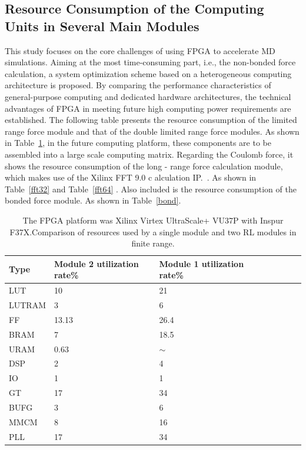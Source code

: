 \documentclass{article}
\begin{document}
\subsection{Resource Consumption of the Computing Units in Several Main Modules}

This study focuses on the core challenges of using FPGA to accelerate MD 
simulations. 
Aiming at the most time-consuming part, i.e., the non-bonded force calculation, 
a system optimization scheme based on a heterogeneous computing architecture is 
proposed. 
By comparing the performance characteristics of general-purpose computing and 
dedicated hardware architectures, the technical advantages of FPGA in meeting 
future high computing power requirements are established. 
The following table presents the resource consumption of the limited range 
force module and that of the double limited range force modules.
As shown in Table~\ref{RL}, in the future computing platform, these components 
are to be assembled into a large scale computing matrix.
Regarding the Coulomb force, it shows the resource consumption of the 
long - range force calculation module, which makes use of the Xilinx FFT 9.0 c
alculation IP.~\cite{fpga23}.
As shown in Table~\ref{fft32} and Table~\ref{fft64} .
Also included is the resource consumption of the bonded force module.
As shown in Table~\ref{bond}.

\begin{table}[!ht]
	\centering
		\caption {The FPGA platform was Xilinx Virtex UltraScale+ VU37P with Inspur F37X.Comparison of resources used by a single module and two RL modules in finite range.}
	\begin{tabular*}{\hsize}{@{}@{\extracolsep{\fill}}llllllll@{}}
		\toprule
		Type &Module 2 utilization rate\%&Module 1 utilization rate\%  \\ 
		\midrule
		LUT &10 & 21 \\ 
		LUTRAM & 3 & 6  \\ 
		FF & 13.13&  26.4 \\ 
		BRAM & 7 & 18.5 \\ 
         URAM & 0.63 & $\sim$\\ 
		DSP &2& 4  \\ 
		IO & 1  & 1 \\ 
		GT & 17 & 34   \\ 
		BUFG & 3  & 6 \\ 
		MMCM & 8  & 16 \\ 
		PLL & 17 & 34 \\  
		\bottomrule
	\end{tabular*}
\label{RL}
\end{table}
\end{document}
